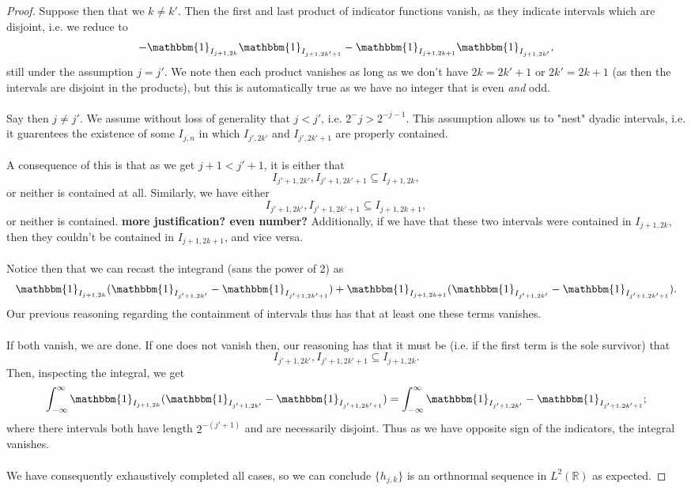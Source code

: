 \documentclass[12pt]{article}
\newenvironment{ex}[2][Exercise]{\begin{trivlist}
\item[\hskip \labelsep {\bfseries #1}\hskip \labelsep {\bfseries #2.}]}{\end{trivlist}}
\begin{document}
\begin{ex}{14}
\begin{enumerate}
\begin{proof}
            Suppose then that we $k \neq k'$. Then the first and last product of indicator functions vanish, as they indicate intervals which are disjoint, i.e. we reduce to
            $$- \mathbbm{1}_{I_{j + 1, 2k}}\mathbbm{1}_{I_{j + 1, 2k' + 1}} - \mathbbm{1}_{I_{j + 1, 2k + 1}}\mathbbm{1}_{I_{j + 1, 2k'}},$$
            still under the assumption $j = j'$. We note then each product vanishes as long as we don't have $2k = 2k' + 1$ or $2k' = 2k + 1$ (as then the intervals are disjoint in the products), but this is automatically true as we have no integer that is even \textit{and} odd. \\ \\ 
            Say then $j \neq j'$. We assume without loss of generality that $j < j'$, i.e. $2^-j > 2^{- j - 1}$. This assumption allows us to "nest" dyadic intervals, i.e. it guarentees the existence of some $I_{j,n}$ in which $I_{j', 2k'}$ and $I_{j', 2k' + 1}$ are properly contained. \\ \\
            A consequence of this is that as we get $j + 1 < j' + 1$, it is either that 
            $$I_{j' + 1, 2k'}, I_{j' + 1, 2k' + 1} \subseteq I_{j + 1, 2k},$$
            or neither is contained at all. Similarly, we have either 
            $$I_{j' + 1, 2k'}, I_{j' + 1, 2k' + 1} \subseteq I_{j + 1, 2k + 1},$$
            or neither is contained. \textbf{more justification? even number?} Additionally, if we have that these two intervals were contained in $I_{j + 1, 2k}$, then they couldn't be contained in $I_{j + 1, 2k+1}$, and vice versa. \\ \\
            Notice then that we can recast the integrand (sans the power of 2) as 
            $$\mathbbm{1}_{I_{j + 1, 2k}} (\mathbbm{1}_{I_{j' + 1, 2k'}} - \mathbbm{1}_{I_{j' + 1, 2k' + 1}}) + \mathbbm{1}_{I_{j + 1, 2k + 1}}(\mathbbm{1}_{I_{j' + 1, 2k'}} - \mathbbm{1}_{I_{j' + 1, 2k' + 1}}).$$
            Our previous reasoning regarding the containment of intervals thus has that at least one these terms vanishes. \\ \\
            If both vanish, we are done. If one does not vanish then, our reasoning has that it must be (i.e. if the first term is the sole survivor) that 
            $$I_{j' + 1, 2k'}, I_{j' + 1, 2k' + 1} \subseteq I_{j + 1, 2k}.$$
            Then, inspecting the integral, we get 
            $$\int_{-\infty}^\infty \mathbbm{1}_{I_{j + 1, 2k}} (\mathbbm{1}_{I_{j' + 1, 2k'}} - \mathbbm{1}_{I_{j' + 1, 2k' + 1}}) = \int_{-\infty}^\infty \mathbbm{1}_{I_{j' + 1, 2k'}} - \mathbbm{1}_{I_{j' + 1, 2k' + 1}};$$
            where there intervals both have length $2^{-(j' + 1)}$ and are necessarily disjoint. Thus as we have opposite sign of the indicators, the integral vanishes. \\ \\
            We have consequently exhaustively completed all cases, so we can conclude $\{h_{j,k}\}$ is an orthnormal sequence in $L^2(\mathbb{R})$ as expected.





\end{proof}
\end{enumerate}
\end{ex}
\end{document}
